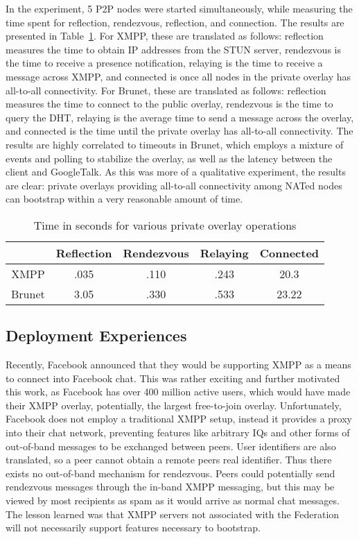 \documentclass[conference]{IEEEtran}
\begin{document}
In the experiment, 5 P2P nodes were started simultaneously, while measuring the
time spent for reflection, rendezvous, reflection, and connection.  The results
are presented in Table~\ref{tab:results}.  For XMPP, these are translated as
follows:  reflection measures the time to obtain IP addresses from the STUN
server, rendezvous is the time to receive a presence notification, relaying is
the time to receive a message across XMPP, and connected is once all nodes in
the private overlay has all-to-all connectivity.  For Brunet, these are
translated as follows:  reflection measures the time to connect to the public
overlay, rendezvous is the time to query the DHT, relaying is the average time
to send a message across the overlay, and connected is the time until the
private overlay has all-to-all connectivity.    The results are highly
correlated to timeouts in Brunet, which employs a mixture of events and
polling to stabilize the overlay, as well as the latency between the client and
GoogleTalk.  As this was more of a qualitative experiment, the results are
clear: private overlays providing all-to-all connectivity among NATed nodes can
bootstrap within a very reasonable amount of time.

\begin{table}[ht]
\centering
\begin{tabular}{|c||c|c|c|c|}
\hline & Reflection & Rendezvous & Relaying & Connected \\ \hline \hline
XMPP & .035 & .110 & .243 & 20.3 \\ \hline
Brunet & 3.05 & .330 & .533 & 23.22 \\ \hline
\end{tabular}
\caption{Time in seconds for various private overlay operations}
\label{tab:results}
\end{table}

\subsection{Deployment Experiences}

Recently, Facebook announced that they would be supporting XMPP as a means to
connect into Facebook chat.  This was rather exciting and further motivated
this work, as Facebook has over 400 million active users, which would have made
their XMPP overlay, potentially, the largest free-to-join overlay.
Unfortunately, Facebook does not employ a traditional XMPP setup, instead it
provides a proxy into their chat network, preventing features like arbitrary
IQs and other forms of out-of-band messages to be exchanged between peers.
User identifiers are also translated, so a peer cannot obtain a remote peers
real identifier.  Thus there exists no out-of-band mechanism for rendezvous.
Peers could potentially send rendezvous messages through the in-band XMPP
messaging, but this may be viewed by most recipients as spam as it would arrive
as normal chat messages.  The lesson learned was that XMPP servers not
associated with the Federation will not necessarily support features necessary
to bootstrap.
\end{document}

